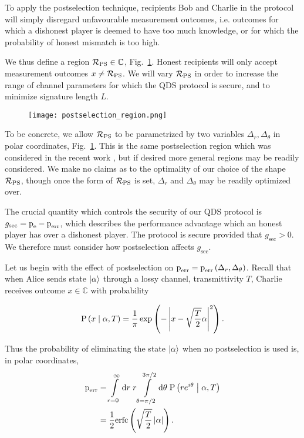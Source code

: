 To apply the postselection technique, recipients Bob and Charlie in the protocol will simply disregard unfavourable measurement outcomes, i.e. outcomes for which a dishonest player is deemed to have too much knowledge, or for which the probability of honest mismatch is too high.

We thus define a region $\mathcal{R}_{\text{PS}} \in \mathbb{C}$, Fig.~\ref{fig:rps}. Honest recipients will only accept measurement outcomes $x \ne \mathcal{R}_{\text{PS}}$. We will vary $\mathcal{R}_{\text{PS}}$ in order to increase the range of channel parameters for which the QDS protocol is secure, and to minimize signature length $L$.

\begin{figure}[htp]
\centering
\texttt{[image: postselection\_region.png]}
\caption{\label{fig:rps}}
\end{figure}

To be concrete, we allow $\mathcal{R}_{\text{PS}}$ to be parametrized by two variables $\Delta_r, \Delta_\theta$ in polar coordinates, Fig.~\ref{fig:rps}. This is the same postselection region which was considered in the recent work , but if desired more general regions may be readily considered. We make no claims as to the optimality of our choice of the shape $\mathcal{R}_{\text{PS}}$, though once the form of $\mathcal{R}_{\text{PS}}$ is set, $\Delta_r$ and $\Delta_\theta$ may be readily optimized over.

The crucial quantity which controls the security of our QDS protocol is $g_{\text{sec}} = \text{p}_{\text{e}} - \text{p}_{\text{err}}$, which describes the performance advantage which an honest player has over a dishonest player. The protocol is secure provided that $g_{\text{sec}} > 0$. We therefore must consider how postselection affects $g_{\text{sec}}$. 

Let us begin with the effect of postselection on $\text{p}_{\text{err}} = \text{p}_{\text{err}}\left(\Delta_r, \Delta_\theta\right)$.  Recall that when Alice sends state $\ket{\alpha}$ through a lossy channel, transmittivity $T$, Charlie receives outcome $x \in \mathbb{C}$ with probability

\begin{equation}
\text{P}\left(x \; \middle| \; \alpha, T\right) = \frac{1}{\pi} \exp\left( - \left| x - \sqrt{\frac{T}{2}}\alpha\right|^2\right).
\end{equation}

\noindent Thus the probability of eliminating the state $\ket{\alpha}$ when no postselection is used is, in polar coordinates,
\begin{align}
\perr &= \int\limits_{r=0}^\infty \mathrm{d}r \; r \int\limits_{\theta = \pi/2}^{3 \pi/2} \mathrm{d}\theta \; \text{P}\left(r e^{i \theta} \given \alpha, T\right) \notag \\
%
&= \frac{1}{2}\erfc\left(\sqrt{\frac{T}{2}}\left|\alpha\right|\right).
\end{align}

